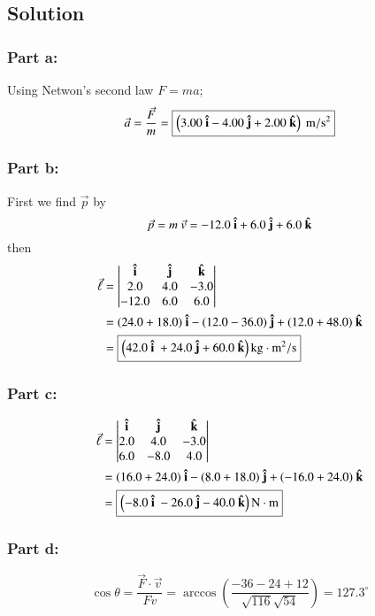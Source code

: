 \documentclass{article}
\begin{document}
\subsection*{Solution}
\subsubsection*{Part a:}
Using Netwon's second law $F = ma$;
\[
	\vec a = \frac{\vec F}{m} = \boxed{\left(3.00\ \vu i - 4.00\ \vu j + 2.00\ \vu k \right)\ \text{m}/\text{s}^2}
\]
\subsubsection*{Part b:}
First we find $\vec p$ by
\[
	\vec p = m\ \vec v = -12.0\ \vu i + 6.0\ \vu j + 6.0\ \vu k
\]
then
\begin{align*}
	\vec \ell &= \begin{vmatrix}
		\vu i & \vu j & \vu k \\
		2.0 & 4.0 & -3.0 \\
		-12.0 & 6.0 & 6.0
		\end{vmatrix} \\
		    &= (24.0 + 18.0)\ \vu i - (12.0-36.0)\ \vu j + (12.0+48.0)\ \vu k \\
		    &= \boxed{\left( 42.0\ \vu i\ + 24.0\ \vu j + 60.0\ \vu k\right) \text{kg}\cdot\text{m}^2/\text{s}}
\end{align*}

\subsubsection*{Part c:}
\begin{align*}
	\vec \ell &= \begin{vmatrix}
		\vu i & \vu j & \vu k \\
		2.0 & 4.0 & -3.0 \\
		6.0 & -8.0 & 4.0
		\end{vmatrix} \\
		    &= (16.0 + 24.0)\ \vu i - (8.0+18.0)\ \vu j + (-16.0+24.0)\ \vu k \\
		    &= \boxed{\left( -8.0\ \vu i\ - 26.0\ \vu j - 40.0\ \vu k\right) \text{N}\cdot\text{m}}
\end{align*}

\subsubsection*{Part d:}
\[
	\cos \theta = \frac{\vec F \cdot \vec v}{F v} = \arccos \left( \frac{-36 -24 + 12}{\sqrt{116} \sqrt{54}}\right) = \boxed{127.3^\circ}
\]
\end{document}

